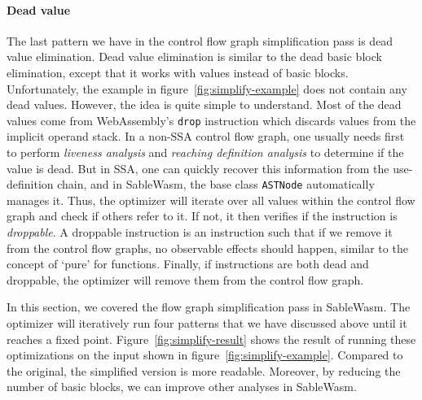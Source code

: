 \paragraph{Dead value}
The last pattern we have in the control flow graph simplification pass is dead
value elimination. Dead value elimination is similar to the dead basic block
elimination, except that it works with values instead of basic blocks.
Unfortunately, the example in figure~\ref{fig:simplify-example} does not contain
any dead values. However, the idea is quite simple to understand. Most of the
dead values come from WebAssembly's \texttt{drop} instruction which discards
values from the implicit operand stack. In a non-SSA control flow graph, one
usually needs first to perform \emph{liveness analysis} and \emph{reaching
    definition analysis} to determine if the value is dead. But in SSA, one can
quickly recover this information from the use-definition chain, and in
SableWasm, the base class \texttt{ASTNode} automatically manages it. Thus, the
optimizer will iterate over all values within the control flow graph and check
if others refer to it. If not, it then verifies if the instruction is
\emph{droppable}. A droppable instruction is an instruction such that if we
remove it from the control flow graphs, no observable effects should happen,
similar to the concept of `pure' for functions. Finally, if instructions are
both dead and droppable, the optimizer will remove them from the control flow
graph.

In this section, we covered the flow graph simplification pass in SableWasm. The
optimizer will iteratively run four patterns that we have discussed above until
it reaches a fixed point. Figure~\ref{fig:simplify-result} shows the result of
running these optimizations on the input shown in
figure~\ref{fig:simplify-example}. Compared to the original, the simplified
version is more readable. Moreover, by reducing the number of basic blocks, we
can improve other analyses in SableWasm.
